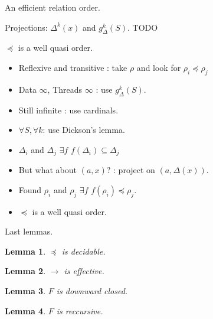 \documentclass{beamer}
\newtheorem{lm}{Lemma}[thr]
\begin{document}
\begin{frame}{An efficient relation order. }
\end{frame}

\begin{frame}{Projections: $\Delta^k(x)$ and $g^k_\Delta(S)$.}
 TODO
\end{frame}
\begin{frame}{$\preceq$ is a well quasi order.}
 \begin{itemize}
  \pause
  \item Reflexive and transitive \pause : take $\rho$ and look for $\rho_i \preceq \rho_j$ \pause
  \item Data $\infty$, Threads $\infty$ \pause : use $g^k_{\Delta}(S)$.  \pause
  \item Still infinite \pause : use cardinals. \pause
  \item $\forall S, \forall k $: use Dickson's lemma. \pause
  \item $\Delta_i$ and $\Delta_j$ \pause $\exists f $ $f(\Delta_i) \subseteq \Delta_j$ \pause
  \item But what about $(a,x)$? \pause : project on $(a,\Delta(x))$. \pause
  \item Found $\rho_i$ and $\rho_j$ \pause $\exists f $ $f(\rho_i) \preceq \rho_j$. \pause 
  \item $\preceq$ is a well quasi order.
 \end{itemize}

\end{frame}

\begin{frame}{Last lemmas.}
\begin{lm} 
  $\preceq$ is decidable.
\end{lm}
\pause
\begin{lm} 
  $\rightarrow$ is effective.
\end{lm}
\pause
\begin{lm} 
  $F$ is downward closed. 
\end{lm}
\pause
\begin{lm} 
  $F$ is reccursive.
\end{lm}

\end{frame}
\end{document}
